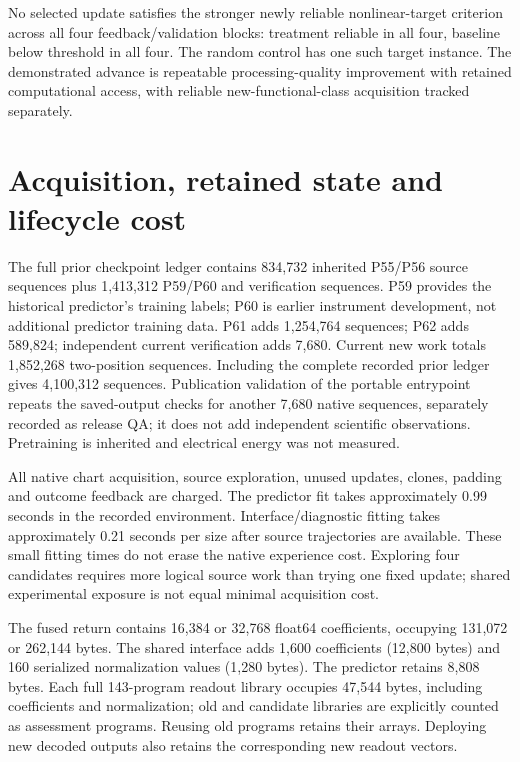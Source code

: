 \documentclass[11pt]{article}
\begin{document}
No selected update satisfies the stronger newly reliable nonlinear-target criterion across all four feedback/validation blocks: treatment reliable in all four, baseline below threshold in all four. The random control has one such target instance. The demonstrated advance is repeatable processing-quality improvement with retained computational access, with reliable new-functional-class acquisition tracked separately.

\section{Acquisition, retained state and lifecycle cost}
The full prior checkpoint ledger contains 834,732 inherited P55/P56 source sequences plus 1,413,312 P59/P60 and verification sequences. P59 provides the historical predictor's training labels; P60 is earlier instrument development, not additional predictor training data. P61 adds 1,254,764 sequences; P62 adds 589,824; independent current verification adds 7,680. Current new work totals 1,852,268 two-position sequences. Including the complete recorded prior ledger gives 4,100,312 sequences. Publication validation of the portable entrypoint repeats the saved-output checks for another 7,680 native sequences, separately recorded as release QA; it does not add independent scientific observations. Pretraining is inherited and electrical energy was not measured.

\begin{table}[ht]\centering\small
\caption{Recorded experiment work, wall time and whole-process peak RSS. Native verification is separately charged; full source/fit/assessment subdivisions are in the ledger.}\label{tab:cost}
\end{table}

All native chart acquisition, source exploration, unused updates, clones, padding and outcome feedback are charged. The predictor fit takes approximately 0.99 seconds in the recorded environment. Interface/diagnostic fitting takes approximately 0.21 seconds per size after source trajectories are available. These small fitting times do not erase the native experience cost. Exploring four candidates requires more logical source work than trying one fixed update; shared experimental exposure is not equal minimal acquisition cost.

The fused return contains 16,384 or 32,768 float64 coefficients, occupying 131,072 or 262,144 bytes. The shared interface adds 1,600 coefficients (12,800 bytes) and 160 serialized normalization values (1,280 bytes). The predictor retains 8,808 bytes. Each full 143-program readout library occupies 47,544 bytes, including coefficients and normalization; old and candidate libraries are explicitly counted as assessment programs. Reusing old programs retains their arrays. Deploying new decoded outputs also retains the corresponding new readout vectors.
\end{document}
